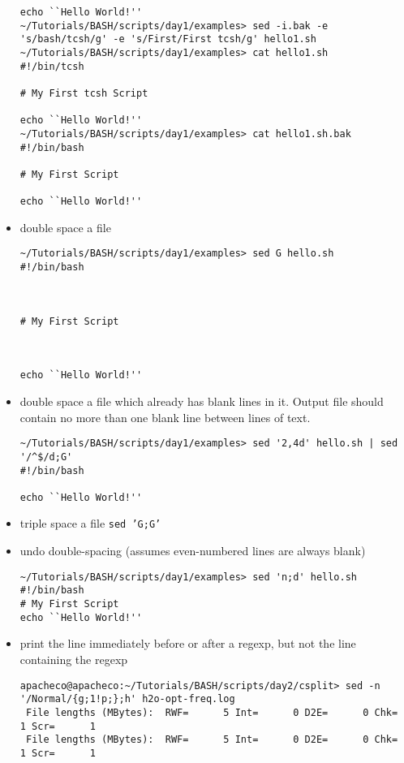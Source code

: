 \documentclass[10pt,t]{beamer}
\begin{document}
\begin{frame}
\begin{itemize}
\begin{lstlisting}[style=LINUX,basicstyle=\fontsize{4}{5}\selectfont\ttfamily]
echo ``Hello World!''
~/Tutorials/BASH/scripts/day1/examples> sed -i.bak -e 's/bash/tcsh/g' -e 's/First/First tcsh/g' hello1.sh 
~/Tutorials/BASH/scripts/day1/examples> cat hello1.sh
#!/bin/tcsh

# My First tcsh Script

echo ``Hello World!''
~/Tutorials/BASH/scripts/day1/examples> cat hello1.sh.bak
#!/bin/bash

# My First Script

echo ``Hello World!''
      \end{lstlisting}
      \item double space a file
        \begin{lstlisting}[style=LINUX]
~/Tutorials/BASH/scripts/day1/examples> sed G hello.sh 
#!/bin/bash



# My First Script



echo ``Hello World!''

        \end{lstlisting}
        \framebreak
      \item double space a file which already has blank lines in it. Output file should contain no more than one blank line between lines of text.
        \begin{lstlisting}[style=LINUX]
~/Tutorials/BASH/scripts/day1/examples> sed '2,4d' hello.sh | sed '/^$/d;G'
#!/bin/bash

echo ``Hello World!''

        \end{lstlisting}
      \item triple space a file \texttt{sed 'G;G'}
      \item  undo double-spacing (assumes even-numbered lines are always blank)
        \begin{lstlisting}[style=LINUX]
~/Tutorials/BASH/scripts/day1/examples> sed 'n;d' hello.sh 
#!/bin/bash
# My First Script
echo ``Hello World!''
        \end{lstlisting}
    \item print the line immediately before or after a regexp, but not the line containing the regexp
      \begin{lstlisting}[style=LINUX]
apacheco@apacheco:~/Tutorials/BASH/scripts/day2/csplit> sed -n '/Normal/{g;1!p;};h' h2o-opt-freq.log 
 File lengths (MBytes):  RWF=      5 Int=      0 D2E=      0 Chk=      1 Scr=      1
 File lengths (MBytes):  RWF=      5 Int=      0 D2E=      0 Chk=      1 Scr=      1


\end{lstlisting}
\end{itemize}
\end{frame}
\end{document}
